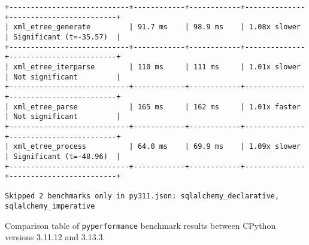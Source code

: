 \begin{code}
\begin{verbatim}
+----------------------------+------------+------------+--------------+-------------------------+
| xml_etree_generate         | 91.7 ms    | 98.9 ms    | 1.08x slower | Significant (t=-35.57)  |
+----------------------------+------------+------------+--------------+-------------------------+
| xml_etree_iterparse        | 110 ms     | 111 ms     | 1.01x slower | Not significant         |
+----------------------------+------------+------------+--------------+-------------------------+
| xml_etree_parse            | 165 ms     | 162 ms     | 1.01x faster | Not significant         |
+----------------------------+------------+------------+--------------+-------------------------+
| xml_etree_process          | 64.0 ms    | 69.9 ms    | 1.09x slower | Significant (t=-48.96)  |
+----------------------------+------------+------------+--------------+-------------------------+

Skipped 2 benchmarks only in py311.json: sqlalchemy_declarative, sqlalchemy_imperative
    \end{verbatim}
    \caption{Comparison table of \texttt{pyperformance} benchmark results between CPython versions 3.11.12 and 3.13.3.}
    \label{listing:pyperformance-results-311-313}
\end{code}

